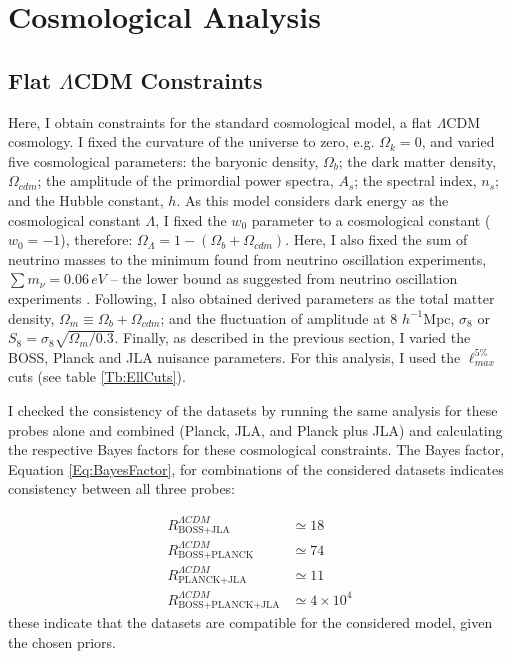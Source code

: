 \section{Cosmological Analysis}\label{Sec:CosmoAnal}
\subsection{Flat $\Lambda$CDM Constraints}\label{Sec:LCDM}
Here, I obtain constraints for the standard cosmological model, a flat $\Lambda$CDM cosmology. I fixed the curvature of the universe to zero, e.g. $\Omega_k = 0$, and varied five cosmological parameters: the baryonic density, $\Omega_b$; the dark matter density, $\Omega_{cdm}$; the amplitude of the primordial power spectra, $A_s$; the spectral index, $n_s$; and the Hubble constant, $h$. As this model considers dark energy as the cosmological constant $\Lambda$, I fixed the $w_0$ parameter to a cosmological constant ($w_0 = -1$), therefore: $\Omega_{\Lambda} = 1 - (\Omega_b + \Omega_{cdm})$. Here, I also fixed the sum of neutrino masses to the minimum found from neutrino oscillation experiments, $\sum m_{\nu} = 0.06 \, eV$ -- the lower bound as suggested from neutrino oscillation experiments \citep{2006NeutrinoReview,2014NeutrinoCosmoPlanck}. Following, I also obtained derived parameters as the total matter density, $\Omega_m \equiv \Omega_b + \Omega_{cdm}$; and the fluctuation of amplitude at 8 $h^{-1}$Mpc, $\sigma_8$ or $S_8 = \sigma_8\sqrt{\Omega_m/0.3}$. Finally, as described in the previous section, I varied the BOSS, Planck and JLA nuisance parameters. For this analysis, I used the $\ell_{max}^{5\%}$ cuts (see table \ref{Tb:EllCuts}).

\qquad I checked the consistency of the datasets by running the same analysis for these probes alone and combined (Planck, JLA, and Planck plus JLA) and calculating the respective Bayes factors for these cosmological constraints. The Bayes factor, Equation \eqref{Eq:BayesFactor},  for combinations of the considered datasets indicates consistency between all three probes:

\begin{align}
R_{\scriptscriptstyle\text{BOSS+JLA}}^{\Lambda CDM} & \simeq 18  \\
R_{\scriptscriptstyle\text{BOSS+PLANCK}}^{\Lambda CDM} & \simeq 74 \\
R_{\scriptscriptstyle\text{PLANCK+JLA}}^{\Lambda CDM} & \simeq 11 \\
R_{\scriptscriptstyle\text{BOSS+PLANCK+JLA}}^{\Lambda CDM} & \simeq 4 \times 10^4
\end{align}
these indicate that the datasets are compatible for the considered model, given the chosen priors.

